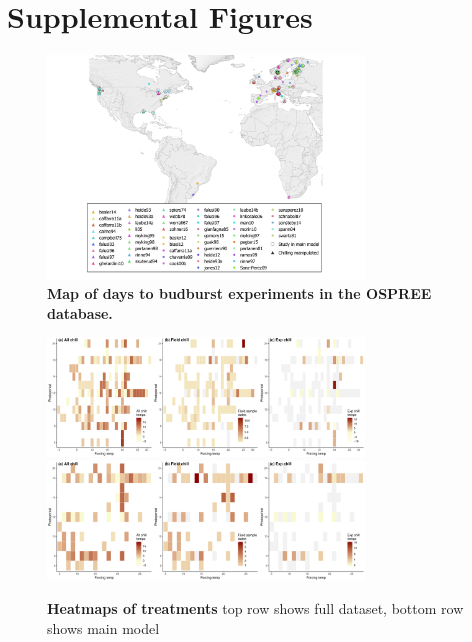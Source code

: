 \documentclass{article}
\begin{document}
\newpage
\section* {Supplemental Figures}

\newpage
\begin{figure}[h!]
\centering
\noindent \includegraphics[width=0.75\textwidth]{..//..//analyses/bb_analysis/figures/ospree_locations5thin.png}
\caption{\textbf{Map of days to budburst experiments in the OSPREE database.}}
\label{fig:map}
\end{figure}

\newpage
\begin{figure}[h!]
\centering
\noindent \includegraphics[width=0.75\textwidth]{..//..//analyses/bb_analysis/figures/studydesign/studydesign_heat3panelallsppmodel.pdf}
\noindent \includegraphics[width=0.75\textwidth]{..//..//analyses/bb_analysis/figures/studydesign/studydesign_heat3panelmainmodel.pdf}
\caption{\textbf{Heatmaps of treatments} top row shows full dataset, bottom row shows main model}
\label{fig:treatheatmaps} %
\end{figure}
\end{document}
